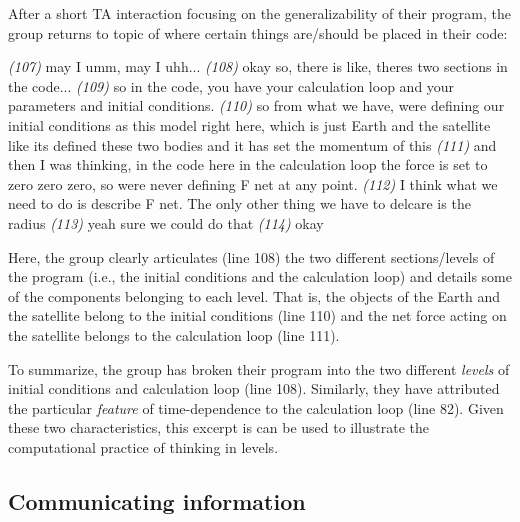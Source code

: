\documentclass{msuphddissertation}
\begin{document}
\begin{doublespace}
After a short TA interaction focusing on the generalizability of their program, the group returns to topic of where certain things are/should be placed in their code: \begin{description}
\SB \textit{(107)} may I umm, may I uhh...
\SB \textit{(108)} okay so, there is like, theres two sections in the code...   
\SB \textit{(109)} so in the code, you have your calculation loop and your parameters and initial conditions.  
\SB \textit{(110)} so from what we have, were defining our initial conditions as this model right here, which is just Earth and the satellite like its defined these two bodies and it has set the momentum of this    
\SB \textit{(111)} and then I was thinking, in the code here {in the calculation loop} the force is set to zero zero zero, so were never defining F net at any point.
\SB \textit{(112)} I think what we need to do is describe F net. The only other thing we have to delcare is the radius    
\SC \textit{(113)} yeah sure we could do that  
\SD \textit{(114)} okay
\end{description}  Here, the group clearly articulates (line 108) the two different sections/levels of the program (i.e., the initial conditions and the calculation loop) and details some of the components belonging to each level.  That is, the objects of the Earth and the satellite belong to the initial conditions (line 110) and the net force acting on the satellite belongs to the calculation loop (line 111).

To summarize, the group has broken their program into the two different \textit{levels} of initial conditions and calculation loop (line 108).  Similarly, they have attributed the particular \textit{feature} of time-dependence to the calculation loop (line 82).  Given these two characteristics, this excerpt is can be used to illustrate the computational practice of thinking in levels.

%
%
%
%
%
%
%
%
%
%
%
%
%
%
%
%

\subsection{Communicating information}\label{CH5:SecCommunicatingInformation}


\end{doublespace}
\end{document}
